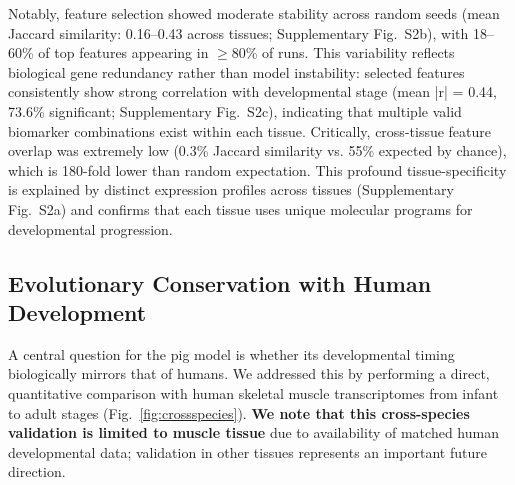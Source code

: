 Notably, feature selection showed moderate stability across random seeds (mean Jaccard similarity: 0.16--0.43 across tissues; Supplementary Fig.~S2b), with 18--60\% of top features appearing in $\geq$80\% of runs. This variability reflects biological gene redundancy rather than model instability: selected features consistently show strong correlation with developmental stage (mean |r| = 0.44, 73.6\% significant; Supplementary Fig.~S2c), indicating that multiple valid biomarker combinations exist within each tissue. Critically, cross-tissue feature overlap was extremely low (0.3\% Jaccard similarity vs. 55\% expected by chance), which is 180-fold lower than random expectation. This profound tissue-specificity is explained by distinct expression profiles across tissues (Supplementary Fig.~S2a) and confirms that each tissue uses unique molecular programs for developmental progression.

\subsection{Evolutionary Conservation with Human Development}

A central question for the pig model is whether its developmental timing biologically mirrors that of humans. We addressed this by performing a direct, quantitative comparison with human skeletal muscle transcriptomes from infant to adult stages \cite{schaiter2024} (Fig.~\ref{fig:crossspecies}). \textbf{We note that this cross-species validation is limited to muscle tissue} due to availability of matched human developmental data; validation in other tissues represents an important future direction.

